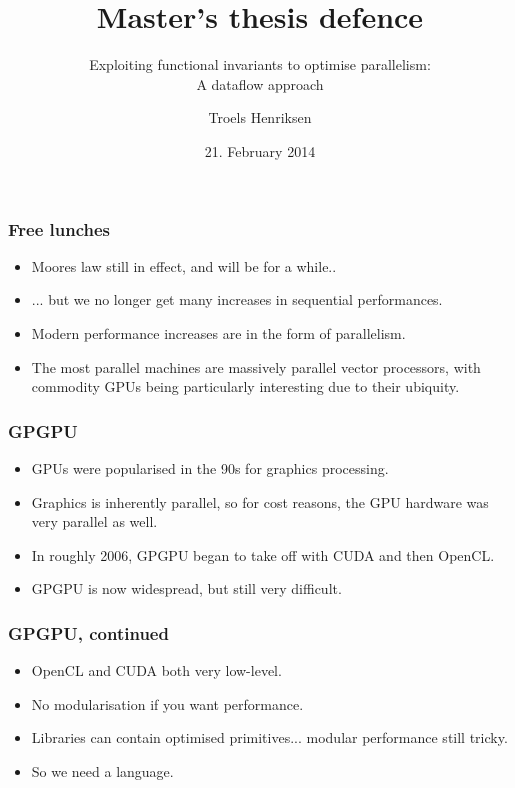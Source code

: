 \documentclass{beamer}
\title{Master's thesis defence}
\subtitle{Exploiting functional invariants to optimise parallelism:\\ A dataflow approach}
\author{Troels Henriksen}
\date{21. February 2014}
\institute{Computer Science\\
  University of Copenhagen}
\begin{document}
\frame{\titlepage}


\begin{frame}
  \frametitle{Free lunches}

  \begin{itemize}
  \item Moores law still in effect, and will be for a while..
  \item ... but we no longer get many increases in sequential
    performances.
  \item Modern performance increases are in the form of parallelism.
  \item The most parallel machines are massively parallel vector
    processors, with commodity GPUs being particularly interesting due
    to their ubiquity.
  \end{itemize}

\end{frame}

\begin{frame}
  \frametitle{GPGPU}

  \begin{itemize}
  \item GPUs were popularised in the 90s for graphics processing.
  \item Graphics is inherently parallel, so for cost reasons, the GPU
    hardware was very parallel as well.
  \item In roughly 2006, GPGPU began to take off with CUDA and then
    OpenCL.
  \item GPGPU is now widespread, but still very difficult.
  \end{itemize}
\end{frame}

\begin{frame}
  \frametitle{GPGPU, continued}

  \begin{itemize}
  \item OpenCL and CUDA both very low-level.
  \item No modularisation if you want performance.
  \item Libraries can contain optimised primitives... modular
    performance still tricky.
  \item So we need a language.
  \end{itemize}
\end{frame}
\end{document}
